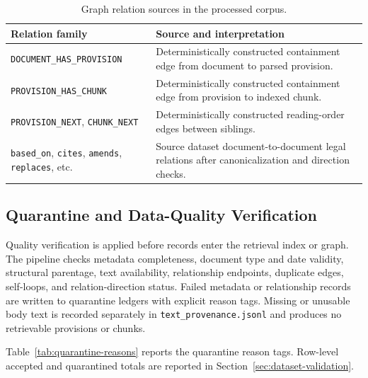 \begin{table}[t]
\centering
\scriptsize
\caption{Graph relation sources in the processed corpus.}
\label{tab:relationship-vocabulary}
\begin{tabularx}{\columnwidth}{@{}p{}X@{}}
\toprule
\textbf{Relation family} & \textbf{Source and interpretation} \\
\midrule
\texttt{DOCUMENT\_HAS\_PROVISION} & Deterministically constructed containment edge from document to parsed provision. \\
\texttt{PROVISION\_HAS\_CHUNK} & Deterministically constructed containment edge from provision to indexed chunk. \\
\texttt{PROVISION\_NEXT}, \texttt{CHUNK\_NEXT} & Deterministically constructed reading-order edges between siblings. \\
\texttt{based\_on}, \texttt{cites}, \texttt{amends}, \texttt{replaces}, etc. & Source dataset document-to-document legal relations after canonicalization and direction checks. \\
\bottomrule
\end{tabularx}
\end{table}

\subsection{Quarantine and Data-Quality Verification}
\label{sec:quarantine}

Quality verification is applied before records enter the retrieval index or graph.
The pipeline checks metadata completeness, document type and date validity, structural parentage, text availability, relationship endpoints, duplicate edges, self-loops, and relation-direction status.
Failed metadata or relationship records are written to quarantine ledgers with explicit reason tags. Missing or unusable body text is recorded separately in \texttt{text\_provenance.jsonl} and produces no retrievable provisions or chunks.

Table~\ref{tab:quarantine-reasons} reports the quarantine reason tags. Row-level accepted and quarantined totals are reported in Section~\ref{sec:dataset-validation}.

